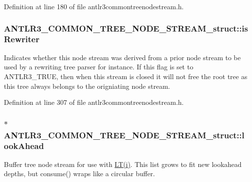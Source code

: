 Definition at line 180 of file antlr3commontreenodestream.\-h.

\hypertarget{struct_a_n_t_l_r3___c_o_m_m_o_n___t_r_e_e___n_o_d_e___s_t_r_e_a_m__struct_abab9e476b6e593a400f6540931e00c19}{
\subsubsection[{is\-Rewriter}]{ A\-N\-T\-L\-R3\-\_\-\-C\-O\-M\-M\-O\-N\-\_\-\-T\-R\-E\-E\-\_\-\-N\-O\-D\-E\-\_\-\-S\-T\-R\-E\-A\-M\-\_\-struct\-::is\-Rewriter}}\label{struct_a_n_t_l_r3___c_o_m_m_o_n___t_r_e_e___n_o_d_e___s_t_r_e_a_m__struct_abab9e476b6e593a400f6540931e00c19}
Indicates whether this node stream was derived from a prior node stream to be used by a rewriting tree parser for instance. If this flag is set to A\-N\-T\-L\-R3\-\_\-\-T\-R\-U\-E, then when this stream is closed it will not free the root tree as this tree always belongs to the origniating node stream. 

Definition at line 307 of file antlr3commontreenodestream.\-h.

\hypertarget{struct_a_n_t_l_r3___c_o_m_m_o_n___t_r_e_e___n_o_d_e___s_t_r_e_a_m__struct_a0f20b040cd9af1326b38607ea89a5ad2}{
\subsubsection[{look\-Ahead}]{$\ast$ A\-N\-T\-L\-R3\-\_\-\-C\-O\-M\-M\-O\-N\-\_\-\-T\-R\-E\-E\-\_\-\-N\-O\-D\-E\-\_\-\-S\-T\-R\-E\-A\-M\-\_\-struct\-::look\-Ahead}}\label{struct_a_n_t_l_r3___c_o_m_m_o_n___t_r_e_e___n_o_d_e___s_t_r_e_a_m__struct_a0f20b040cd9af1326b38607ea89a5ad2}
Buffer tree node stream for use with \hyperlink{cif_parser_8cpp_a835a564399f4498da6ccbef2dcdd277e}{L\-T(i)}. This list grows to fit new lookahead depths, but consume() wraps like a circular buffer. 

